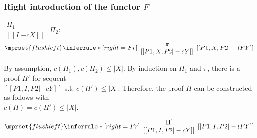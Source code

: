 \subsubsection{Right introduction of the functor $F$}
\begin{center}
  \scriptsize
  \begin{math}
    \begin{array}{c}
      \Pi_1 \\
      {[[I |-c X]]}
    \end{array}
  \end{math}
  \qquad\qquad
  $\Pi_2$:
  \begin{math}
    $$\mprset{flushleft}
    \inferrule* [right={\tiny Fr}] {
      {
        \begin{array}{c}
          \pi \\
          {[[P1, X, P2 |-c Y]]}
        \end{array}
      }
    }{[[P1, X, P2 |-l F Y]]}
  \end{math}
\end{center}
By assumption, $c(\Pi_1),c(\Pi_2)\leq |X|$. By induction on $\Pi_1$
and $\pi$, there is a proof $\Pi'$ for sequent \\
$[[P1, I, P2 |-c Y]]$ s.t. $c(\Pi') \leq |X|$. Therefore, the proof $\Pi$
can be constructed as follows with \\
$c(\Pi) = c(\Pi') \leq |X|$.
\begin{center}
  \scriptsize
  \begin{math}
    $$\mprset{flushleft}
    \inferrule* [right={\tiny Fr}] {
      {
        \begin{array}{c}
          \Pi' \\
          {[[P1, I, P2 |-c Y]]}
        \end{array}
      }
    }{[[P1, I, P2 |-l F Y]]}
  \end{math}
\end{center}



